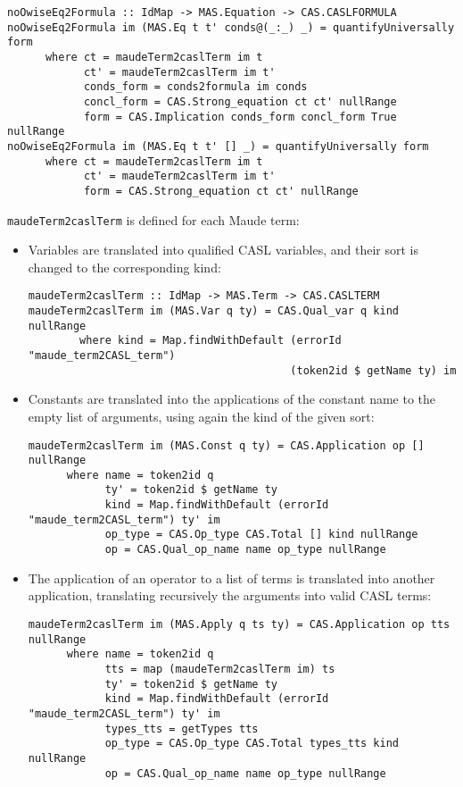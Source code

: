 {\codesize
\begin{verbatim}
noOwiseEq2Formula :: IdMap -> MAS.Equation -> CAS.CASLFORMULA
noOwiseEq2Formula im (MAS.Eq t t' conds@(_:_) _) = quantifyUniversally form
      where ct = maudeTerm2caslTerm im t
            ct' = maudeTerm2caslTerm im t'
            conds_form = conds2formula im conds
            concl_form = CAS.Strong_equation ct ct' nullRange
            form = CAS.Implication conds_form concl_form True nullRange
noOwiseEq2Formula im (MAS.Eq t t' [] _) = quantifyUniversally form
      where ct = maudeTerm2caslTerm im t
            ct' = maudeTerm2caslTerm im t'
            form = CAS.Strong_equation ct ct' nullRange
\end{verbatim}
}

\verb"maudeTerm2caslTerm" is defined for each Maude term:

\begin{itemize}

\item Variables are translated into qualified CASL variables, and their
sort is changed to the corresponding kind:

{\codesize
\begin{verbatim}
maudeTerm2caslTerm :: IdMap -> MAS.Term -> CAS.CASLTERM
maudeTerm2caslTerm im (MAS.Var q ty) = CAS.Qual_var q kind nullRange
        where kind = Map.findWithDefault (errorId "maude_term2CASL_term")
                                         (token2id $ getName ty) im
\end{verbatim}
}

\item Constants are translated into the applications of the constant
name to the empty list of arguments, using again the kind of the
given sort:

{\codesize
\begin{verbatim}
maudeTerm2caslTerm im (MAS.Const q ty) = CAS.Application op [] nullRange
      where name = token2id q
            ty' = token2id $ getName ty
            kind = Map.findWithDefault (errorId "maude_term2CASL_term") ty' im
            op_type = CAS.Op_type CAS.Total [] kind nullRange
            op = CAS.Qual_op_name name op_type nullRange
\end{verbatim}
}

\item The application of an operator to a list of terms is translated
into another application, translating recursively the arguments into
valid CASL terms:

{\codesize
\begin{verbatim}
maudeTerm2caslTerm im (MAS.Apply q ts ty) = CAS.Application op tts nullRange
      where name = token2id q
            tts = map (maudeTerm2caslTerm im) ts
            ty' = token2id $ getName ty
            kind = Map.findWithDefault (errorId "maude_term2CASL_term") ty' im
            types_tts = getTypes tts
            op_type = CAS.Op_type CAS.Total types_tts kind nullRange
            op = CAS.Qual_op_name name op_type nullRange
\end{verbatim}
}

\end{itemize}

